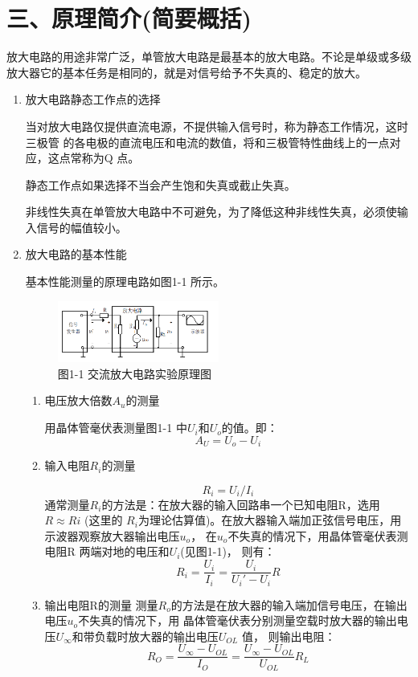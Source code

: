 \documentclass[a4paper,10pt,notitlepage]{article}
\begin{document}
		\section*{三、原理简介(简要概括)}
			\setlength{\parindent}{2em} 
		\indent 放大电路的用途非常广泛，单管放大电路是最基本的放大电路。不论是单级或多级放大器它的基本任务是相同的，就是对信号给予不失真的、稳定的放大。\par
		\begin{enumerate}
			\item  放大电路静态工作点的选择\par
			当对放大电路仅提供直流电源，不提供输入信号时，称为静态工作情况，这时三极管
			的各电极的直流电压和电流的数值，将和三极管特性曲线上的一点对应，这点常称为Q
			点。\par
			静态工作点如果选择不当会产生饱和失真或截止失真。\par
			非线性失真在单管放大电路中不可避免，为了降低这种非线性失真，必须使输入信号的幅值较小。\par
			\item  放大电路的基本性能\par
			基本性能测量的原理电路如图1-1 所示。\par
			\begin{figure}[t]
				\centering
				\includegraphics[width=0.5\textwidth]{1-2.png}
				\caption*{图1-1 交流放大电路实验原理图}
			\end{figure}
			\begin{enumerate}
				\item 电压放大倍数$A_u$的测量\par
				用晶体管毫伏表测量图1-1 中$U_i$和$U_o$的值。即：
				$$A_U=U_o-U_i$$
				\item 输入电阻$R_i$的测量\par
				$$R_i=U_i/I_i$$
				通常测量$R_i$的方法是：在放大器的输入回路串一个已知电阻R，选用$R\approx Ri$ (这里的
				$R_i$为理论估算值)。在放大器输入端加正弦信号电压，用示波器观察放大器输出电压$u_o$，
				在$u_o$不失真的情况下，用晶体管毫伏表测电阻R 两端对地的电压和$U_i$(见图1-1)，
				则有：
				$$R_i=\frac{U_i}{I_i}=\frac{U_i}{U_i'-U_i}R$$
				\item 输出电阻R的测量
				测量$R_o$的方法是在放大器的输入端加信号电压，在输出电压$u_o$不失真的情况下，用
				晶体管毫伏表分别测量空载时放大器的输出电压$U_\infty$和带负载时放大器的输出电压$U_{OL}$ 值，
				则输出电阻：
				$$R_O=\frac{U_\infty-U_{OL}}{I_O}=\frac{U_\infty-U_{OL}}{U_{OL}}R_L$$
			\end{enumerate}
		\end{enumerate}
\end{document}
